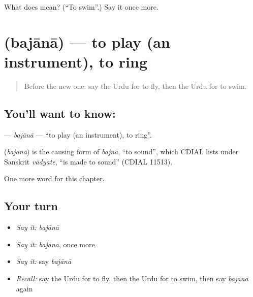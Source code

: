 \begin{tcolorbox}[breakable,colback=teal!4,colframe=teal!35!black,title={Before you move on}]
What does  mean? (\textquotedblleft{}To swim\textquotedblright{}.) Say it once more.
\end{tcolorbox}
\section[\texorpdfstring{\ur{بجانا} (bajānā)}{بجانا (bajānā)}]{ (bajānā) — to play (an instrument), to ring}

\label{lesson:UR-C138-bajana}



\begin{quote}
Before the new one: say the Urdu for to fly, then the Urdu for to swim.
\end{quote}

\subsection*{You'll want to know: }
\textbf{} — \emph{bajānā} — \textquotedblleft{}to play (an instrument), to ring\textquotedblright{}.

\begin{cousinweb}
\textbf{} (\emph{bajānā}) is the causing form of \emph{bajnā}, \textquotedblleft{}to sound\textquotedblright{}, which CDIAL lists under Sanskrit \emph{vādyate}, \textquotedblleft{}is made to sound\textquotedblright{} (CDIAL 11513).
\end{cousinweb}

\begin{grammarlens}[title={What you've built}]
One more word for this chapter.
\end{grammarlens}

\subsection*{Your turn}
\begin{itemize}
\raggedright
  \item \emph{Say it:} \emph{bajānā}
  \item \emph{Say it:} \emph{bajānā}, once more
  \item \emph{Say it:} say \emph{bajānā}
  \item \emph{Recall:} say the Urdu for to fly, then the Urdu for to swim, then say \emph{bajānā} again
\end{itemize}

